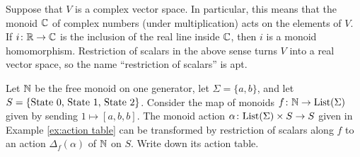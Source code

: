 \begin{exampleENG}
Suppose that $V$ is a complex vector space. In particular, this means that the monoid ${\mathbb C}$ of complex numbers (under multiplication) acts on the elements of $V$. If $i\colon{\mathbb R}\rightarrow{\mathbb C}$ is the inclusion of the real line inside ${\mathbb C}$, then $i$ is a monoid homomorphism. Restriction of scalars in the above sense turns $V$ into a real vector space, so the name “restriction of scalars” is apt.
\end{exampleENG}

\begin{exampleRUS}
\end{exampleRUS}

\begin{exerciseENG}
Let ${\mathbb N}$ be the free monoid on one generator, let $\Sigma=\{a,b\}$, and let $S=\{\textnormal{State 0, State 1, State 2}\}$. Consider the map of monoids $f\colon{\mathbb N}\rightarrow\textnormal{List}(\Sigma)$ given by sending $1\mapsto [a,b,b]$. The monoid action $\alpha\colon\textnormal{List}(\Sigma)\times S\rightarrow S$ given in Example \ref{ex:action table} can be transformed by restriction of scalars along $f$ to an action $\Delta_f(\alpha)$ of ${\mathbb N}$ on $S$. Write down its action table.
\end{exerciseENG}

\begin{exerciseRUS}
\end{exerciseRUS}
